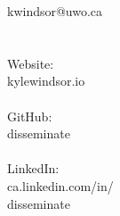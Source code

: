 
\begin{minipage}[t]{0.25\hsize}\color{contact} %
	kwindsor@uwo.ca\\
	\\\\
	Website:\\
	kylewindsor.io\\
	\\
	GitHub:\\
	disseminate\\
	\\
	LinkedIn:\\
	ca.linkedin.com/in/\\
	disseminate\\
\end{minipage}
